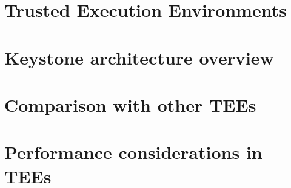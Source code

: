\section{Trusted Execution Environments}

\section{Keystone architecture overview}

\section{Comparison with other TEEs}

\section{Performance considerations in TEEs}